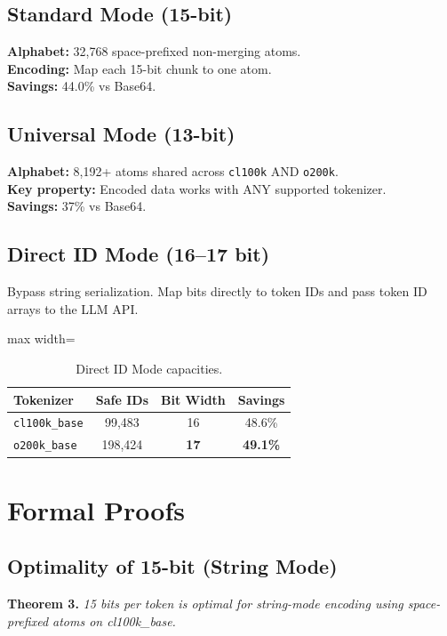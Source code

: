\documentclass[10pt,twocolumn,letterpaper]{article}
\begin{document}
\subsection{Standard Mode (15-bit)}
\textbf{Alphabet:} 32,768 space-prefixed non-merging atoms.\\
\textbf{Encoding:} Map each 15-bit chunk to one atom.\\
\textbf{Savings:} 44.0\% vs Base64.

\subsection{Universal Mode (13-bit)}
\textbf{Alphabet:} 8,192+ atoms shared across \texttt{cl100k} AND \texttt{o200k}.\\
\textbf{Key property:} Encoded data works with ANY supported tokenizer.\\
\textbf{Savings:} 37\% vs Base64.

\subsection{Direct ID Mode (16--17 bit)}
Bypass string serialization. Map bits directly to token IDs and pass token ID arrays to the LLM API.

\begin{table}[h]
\centering
\begin{adjustbox}{max width=\columnwidth}
\begin{tabular}{lccc}
\toprule
Tokenizer & Safe IDs & Bit Width & Savings \\
\midrule
\texttt{cl100k\_base} & 99,483 & 16 & 48.6\% \\
\texttt{o200k\_base} & 198,424 & \textbf{17} & \textbf{49.1\%} \\
\bottomrule
\end{tabular}
\end{adjustbox}
\caption{Direct ID Mode capacities.}
\label{tab:did}
\end{table}

\section{Formal Proofs}

\subsection{Optimality of 15-bit (String Mode)}
\textbf{Theorem 3.} \textit{15 bits per token is optimal for string-mode encoding using space-prefixed atoms on cl100k\_base.}
\end{document}
